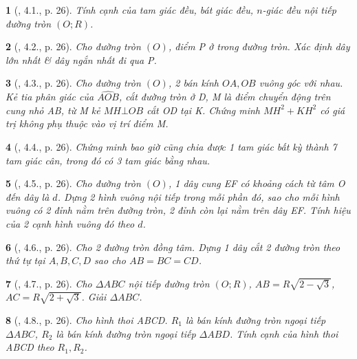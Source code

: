 \documentclass{article}
\newtheorem{baitoan}{}
\begin{document}
\begin{baitoan}[\cite{TLCT_THCS_Toan_9_hinh_hoc}, 4.1., p. 26]
	Tính cạnh của tam giác đều, bát giác đều, $n$-giác đều nội tiếp đường tròn $(O;R)$.
\end{baitoan}

\begin{baitoan}[\cite{TLCT_THCS_Toan_9_hinh_hoc}, 4.2., p. 26]
	Cho đường tròn $(O)$, điểm P ở trong đường tròn. Xác định dây lớn nhất \& dây ngắn nhất đi qua P.
\end{baitoan}

\begin{baitoan}[\cite{TLCT_THCS_Toan_9_hinh_hoc}, 4.3., p. 26]
	Cho đường tròn $(O)$, 2 bán kính $OA,OB$ vuông góc với nhau. Kẻ tia phân giác của $\widehat{AOB}$, cắt đường tròn ở D, M là điểm chuyển động trên cung nhỏ AB, từ M kẻ $MH\bot OB$ cắt OD tại K. Chứng minh $MH^2 + KH^2$ có giá trị không phụ thuộc vào vị trí điểm M.
\end{baitoan}

\begin{baitoan}[\cite{TLCT_THCS_Toan_9_hinh_hoc}, 4.4., p. 26]
	Chứng minh bao giờ cũng chia được 1 tam giác bất kỳ thành 7 tam giác cân, trong đó có 3 tam giác bằng nhau.
\end{baitoan}

\begin{baitoan}[\cite{TLCT_THCS_Toan_9_hinh_hoc}, 4.5., p. 26]
	Cho đường tròn $(O)$, 1 dây cung EF có khoảng cách từ tâm O đến dây là $d$. Dựng 2 hình vuông nội tiếp trong mỗi phần đó, sao cho mỗi hình vuông có 2 đỉnh nằm trên đường tròn, 2 đỉnh còn lại nằm trên dây EF. Tính hiệu của 2 cạnh hình vuông đó theo $d$.
\end{baitoan}

\begin{baitoan}[\cite{TLCT_THCS_Toan_9_hinh_hoc}, 4.6., p. 26]
	Cho 2 đường tròn đồng tâm. Dựng 1 dây cắt 2 đường tròn theo thứ tự tại $A,B,C,D$ sao cho $AB = BC = CD$.
\end{baitoan}

\begin{baitoan}[\cite{TLCT_THCS_Toan_9_hinh_hoc}, 4.7., p. 26]
	Cho $\Delta ABC$ nội tiếp đường tròn $(O;R)$, $AB = R\sqrt{2 - \sqrt{3}}$, $AC = R\sqrt{2 + \sqrt{3}}$. Giải $\Delta ABC$.
\end{baitoan}

\begin{baitoan}[\cite{TLCT_THCS_Toan_9_hinh_hoc}, 4.8., p. 26]
	Cho hình thoi ABCD. $R_1$ là bán kính đường tròn ngoại tiếp $\Delta ABC$, $R_2$ là bán kính đường tròn ngoại tiếp $\Delta ABD$. Tính cạnh của hình thoi ABCD theo $R_1,R_2$.
\end{baitoan}
\end{document}
